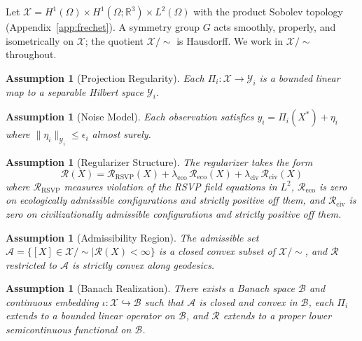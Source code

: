 \documentclass[12pt, oneside]{article}
\newtheorem{assumption}[theorem]{Assumption}
\newcommand{\Xmod}{\mathcal{X}/{\sim}}
\begin{document}
Let $\mathcal{X} = H^1(\Omega) \times H^1(\Omega;\mathbb{R}^3) \times L^2(\Omega)$
with the product Sobolev topology (Appendix~\ref{app:frechet}). A symmetry group $G$
acts smoothly, properly, and isometrically on $\mathcal{X}$; the quotient $\Xmod$ is
Hausdorff. We work in $\Xmod$ throughout.

\begin{assumption}[Projection Regularity]
\label{ass:regularity}
Each $\Pi_i : \mathcal{X} \to \mathcal{Y}_i$ is a bounded linear map to a separable
Hilbert space $\mathcal{Y}_i$.
\end{assumption}

\begin{assumption}[Noise Model]
\label{ass:noise}
Each observation satisfies $y_i = \Pi_i(X^*) + \eta_i$ where $\|\eta_i\|_{\mathcal{Y}_i}
\le \epsilon_i$ almost surely.
\end{assumption}

\begin{assumption}[Regularizer Structure]
\label{ass:regularizer}
The regularizer takes the form
\[
\mathcal{R}(X) = \mathcal{R}_{\mathrm{RSVP}}(X)
+ \lambda_{\mathrm{eco}}\,\mathcal{R}_{\mathrm{eco}}(X)
+ \lambda_{\mathrm{civ}}\,\mathcal{R}_{\mathrm{civ}}(X)
\]
where $\mathcal{R}_{\mathrm{RSVP}}$ measures violation of the RSVP field equations in
$L^2$, $\mathcal{R}_{\mathrm{eco}}$ is zero on ecologically admissible configurations
and strictly positive off them, and $\mathcal{R}_{\mathrm{civ}}$ is zero on
civilizationally admissible configurations and strictly positive off them.
\end{assumption}

\begin{assumption}[Admissibility Region]
\label{ass:admissibility}
The admissible set $\mathcal{A} = \{[X] \in \Xmod \mid \mathcal{R}(X) < \infty\}$
is a closed convex subset of $\Xmod$, and $\mathcal{R}$ restricted to $\mathcal{A}$
is strictly convex along geodesics.
\end{assumption}

\begin{assumption}[Banach Realization]
\label{ass:banach}
There exists a Banach space $\mathcal{B}$ and continuous embedding
$\iota : \mathcal{X} \hookrightarrow \mathcal{B}$ such that $\mathcal{A}$ is closed and
convex in $\mathcal{B}$, each $\Pi_i$ extends to a bounded linear operator on
$\mathcal{B}$, and $\mathcal{R}$ extends to a proper lower semicontinuous functional on
$\mathcal{B}$.
\end{assumption}
\end{document}
